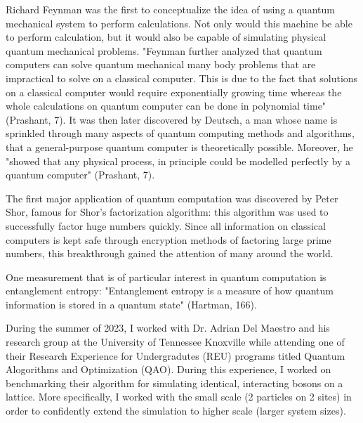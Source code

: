 

Richard Feynman was the first to conceptualize the idea of using a quantum mechanical system to perform calculations. Not only would this machine be able to perform calculation, but it would also be capable of simulating physical quantum mechanical problems. "Feynman further analyzed that quantum computers can solve quantum mechanical many body problems that are impractical to solve on a classical computer. This is due to the fact that solutions on a classical computer would require exponentially growing time whereas the whole calculations on quantum computer can be done in polynomial time" (Prashant, 7). It was then later discovered by Deutsch, a man whose name is sprinkled through many aspects of quantum computing methods and algorithms, that a general-purpose quantum computer is theoretically possible. Moreover, he "showed that any physical process, in principle could be modelled perfectly by a quantum computer" (Prashant, 7).

The first major application of quantum computation was discovered by Peter Shor, famous for Shor's factorization algorithm: this algorithm was used to successfully factor huge numbers quickly. Since all information on classical computers is kept safe through encryption methods of factoring large prime numbers, this breakthrough gained the attention of many around the world.

One measurement that is of particular interest in quantum computation is entanglement entropy: "Entanglement entropy is a measure of how quantum information is stored in a quantum state" (Hartman, 166).

During the summer of 2023, I worked with Dr. Adrian Del Maestro and his research group at the University of Tennessee Knoxville while attending one of their Research Experience for Undergradutes (REU) programs titled Quantum Alogorithms and Optimization (QAO). During this experience, I worked on benchmarking their algorithm for simulating identical, interacting bosons on a lattice. More specifically, I worked with the small scale (2 particles on 2 sites) in order to confidently extend the simulation to higher scale (larger system sizes).